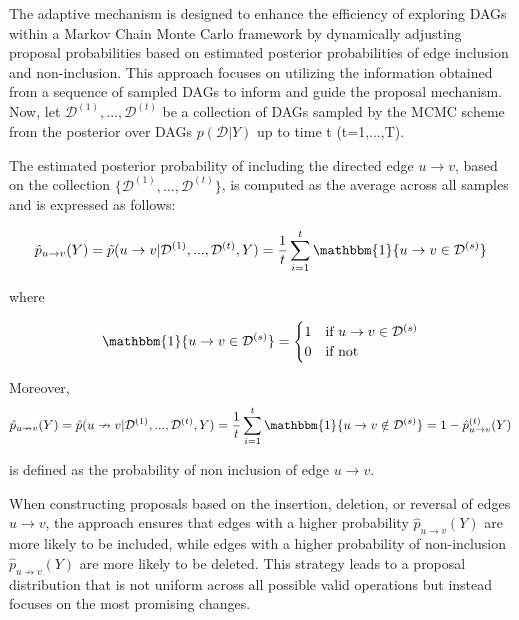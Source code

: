 \documentclass{report}
\begin{document}
The adaptive mechanism is designed to enhance the efficiency of exploring DAGs within a Markov Chain Monte Carlo framework by dynamically adjusting proposal probabilities based on estimated posterior probabilities of edge inclusion and non-inclusion. This approach focuses on utilizing the information obtained from a sequence of sampled DAGs to inform and guide the proposal mechanism.
Now, let $\mathcal{D}^{(1)},...,\mathcal{D}^{(t)}$ be a collection of DAGs sampled by the MCMC scheme from the posterior over DAGs $p(\mathcal{D}|Y)$ up to time t (t=1,...,T).

The estimated posterior probability of including the directed edge $u \rightarrow v $, based on the collection $\{\mathcal{D}^{(1)},...,\mathcal{D}^{(t)}\}$, is computed as the average across all samples and is expressed as follows:

$$\hat{p}_{u\rightarrow v} (Y) =\hat{p} (u \rightarrow v | \mathcal{D}^{(1)},...,\mathcal{D}^{(t)}, Y) = \frac{1}{t}\sum^t_{i=1} \mathbbm{1} \{u \rightarrow v  \in \mathcal{D}^{(s)}\}$$ 

where

\begin{equation} \label{posterior-prob}
	\mathbbm{1} \{u \rightarrow v  \in \mathcal{D}^{(s)}\} = \begin{cases}
		1 & \text{if} \  u \rightarrow v \in  \mathcal{D}^{(s)}\\
		0 & \text{if not}
	\end{cases}
\end{equation}

Moreover, $$\hat{p}_{u\nrightarrow v} (Y) =\hat{p} (u \nrightarrow v | \mathcal{D}^{(1)},...,\mathcal{D}^{(t)}, Y) = \frac{1}{t}\sum^t_{i=1} \mathbbm{1} \{u \rightarrow v  \notin \mathcal{D}^{(s)}\} = 1- \hat{p}^{(t)}_{u\rightarrow v} (Y)$$

is defined as the probability of non inclusion of edge $u \rightarrow v $.

When constructing proposals based on the insertion, deletion, or reversal of edges $u \rightarrow v $, the approach ensures that edges with a higher probability $\hat{p}_{u\rightarrow v} (Y)$ are more likely to be included, while edges with a higher probability of non-inclusion $\hat{p}_{u\nrightarrow v} (Y)$ are more likely to be deleted. This strategy leads to a proposal distribution that is not uniform across all possible valid operations but instead focuses on the most promising changes.
\end{document}
